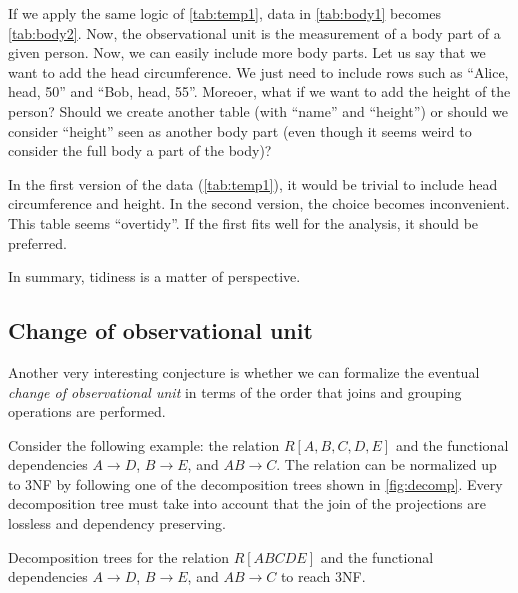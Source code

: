 If we apply the same logic of \cref{tab:temp1}, data in \cref{tab:body1} becomes
\cref{tab:body2}.  Now, the observational unit is the measurement of a body part of a
given person.  Now, we can easily include more body parts.  Let us say that we want to add
the head circumference.  We just need to include rows such as ``Alice, head, 50'' and
``Bob, head, 55''.  Moreoer, what if we want to add the height of the person? Should we
create another table (with ``name'' and ``height'') or should we consider ``height'' seen
as another body part (even though it seems weird to consider the full body a part of the
body)?

In the first version of the data (\cref{tab:temp1}), it would be trivial to include head
circumference and height.  In the second version, the choice becomes inconvenient.  This
table seems ``overtidy''.  If the first fits well for the analysis, it should be
preferred.

In summary, tidiness is a matter of perspective.

\subsection{Change of observational unit}
\label{sub:change-unit}

Another very interesting conjecture is whether we can formalize the eventual \emph{change
of observational unit} in terms of the order that joins and grouping operations are
performed.

Consider the following example: the relation $R[A, B, C, D, E]$ and the functional
dependencies $A \to D$, $B \to E$, and $AB \to C$.  The relation can be normalized up to
3NF by following one of the decomposition trees shown in \cref{fig:decomp}.
Every decomposition tree must take into account that the join of the projections are
lossless and dependency preserving.

\begin{figurebox}[label=fig:decomp]{Decomposition trees for the relation $R[ABCDE]$ and
  the functional dependencies $A \to D$, $B \to E$, and $AB \to C$ to reach 3NF.}
  \centering
\end{figurebox}

